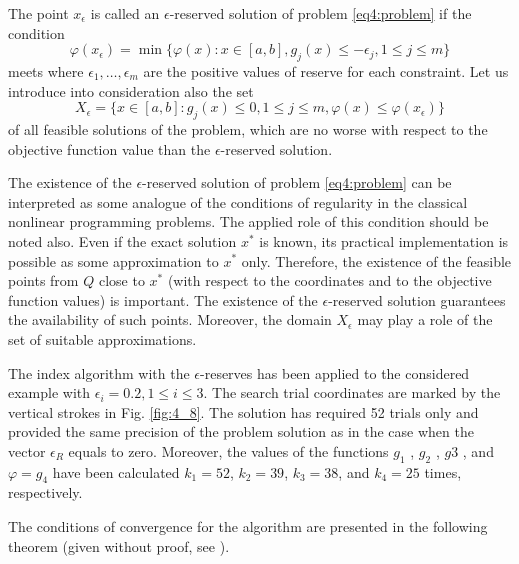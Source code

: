 \documentclass[graybox]{svmult}
\begin{document}
\begin{definition}
  The point $x_\epsilon$ is called an $\epsilon$-reserved solution of problem \eqref{eq4:problem} if the condition
  \begin{equation}
    \label{eq4:eps_res_problem}
    \varphi(x_\epsilon)=\min\{\varphi(x):x\in [a,b], g_j(x)\le -\epsilon_j,1\le j\le m\}
  \end{equation}
  meets where $\epsilon_1, \dots,\epsilon_m$ are the positive values of reserve for each constraint. Let us introduce into consideration also the set
  \begin{equation}
    \label{eq4:x_epsilon}
    X_\epsilon = \{x\in[a,b]:g_j(x)\le 0, 1\le j\le m, \varphi(x)\le\varphi(x_\epsilon)\}
  \end{equation}
  of all feasible solutions of the problem, which are no worse with respect to the objective function value than the $\epsilon$-reserved solution.
\end{definition}

The existence of the $\epsilon$-reserved solution of problem \eqref{eq4:problem} can be interpreted as some analogue of the conditions of regularity in the classical nonlinear programming problems. The applied role of this condition should be noted also. Even if the exact solution $x^*$ is known, its practical implementation is possible as some approximation to $x^*$ only. Therefore, the existence of the feasible points from $Q$ close to $x^*$ (with respect to the coordinates and to the objective
function values) is important. The existence of the $\epsilon$-reserved solution guarantees the availability of such points. Moreover, the domain $X_\epsilon$ may play a role of the set of suitable approximations.

The index algorithm with the $\epsilon$-reserves has been applied to the considered example with $\epsilon_i=0.2, 1\le i\le 3$. The search trial coordinates are marked by the vertical strokes in Fig. \ref{fig:4_8}. The solution has required 52 trials only and provided the same precision of the problem solution as in
the case when the vector $\epsilon_R$ equals to zero. Moreover, the values of the functions $g_1$ , $g_2$ , $g 3$ , and $\varphi=g_4$ have been calculated $k_1 =52$, $k_2 =39$, $k_3 =38$, and $k_4 =25$ times, respectively.

The conditions of convergence for the algorithm are presented in the following theorem (given without proof, see \cite{}).
\end{document}
